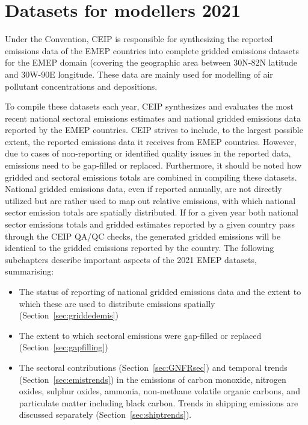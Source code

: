 \section{Datasets for modellers 2021}
\label{sec:modeldata}

Under the Convention, CEIP is responsible for synthesizing the reported emissions data of the EMEP countries into complete gridded emissions datasets for the EMEP domain (covering the geographic area between 30\degrees N-82\degrees N latitude and 30\degrees W-90\degrees E longitude. These data are mainly used for modelling of air pollutant concentrations and depositions.

To compile these datasets each year, CEIP synthesizes and evaluates the most recent national sectoral emissions estimates and national gridded emissions data reported by the EMEP countries. CEIP strives to include, to the largest possible extent, the reported emissions data it receives from EMEP countries. However, due to cases of non-reporting or identified quality issues in the reported data, emissions need to be gap-filled or replaced. Furthermore, it should be noted how gridded and sectoral emissions totals are combined in compiling these datasets. National gridded emissions data, even if reported annually, are not directly utilized but are rather used to map out relative emissions, with which national sector emission totals are spatially distributed. If for a given year both national sector emissions totals and gridded estimates reported by a given country pass through the CEIP QA/QC checks, the generated gridded emissions will be identical to the gridded emissions reported by the country.
The following subchapters describe important aspects of the 2021 EMEP datasets, summarising:

\begin{itemize}
    \item The status of reporting of national gridded emissions data and the extent to which these are used to distribute emissions spatially (Section~\ref{sec:griddedemis})
    \item The extent to which sectoral emissions were gap-filled or replaced (Section~\ref{sec:gapfilling})
    \item  The sectoral contributions (Section~\ref{sec:GNFRsec}) and temporal trends (Section~\ref{sec:emistrends}) in the emissions of carbon monoxide, nitrogen oxides, sulphur oxides, ammonia, non-methane volatile organic carbons, and particulate matter including black carbon. Trends in shipping emissions are discussed separately (Section~\ref{sec:shiptrends}).     
\end{itemize}


